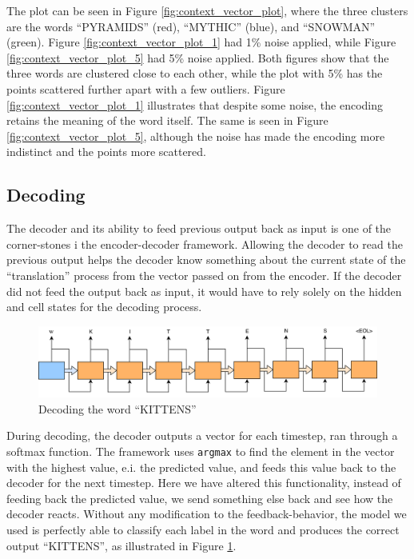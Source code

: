 The plot can be seen in Figure \ref{fig:context_vector_plot}, where the three clusters are the words ``PYRAMIDS'' (red), ``MYTHIC'' (blue), and ``SNOWMAN'' (green). Figure \ref{fig:context_vector_plot_1} had 1\% noise applied, while Figure \ref{fig:context_vector_plot_5} had 5\% noise applied. Both figures show that the three words are clustered close to each other, while the plot with 5\% has the points scattered further apart with a few outliers. Figure \ref{fig:context_vector_plot_1} illustrates that despite some noise, the encoding retains the meaning of the word itself. The same is seen in Figure \ref{fig:context_vector_plot_5}, although the noise has made the encoding more indistinct and the points more scattered.

\subsection{Decoding}
The decoder and its ability to feed previous output back as input is one of the corner-stones i the encoder-decoder framework. Allowing the decoder to read the previous output helps the decoder know something about the current state of the ``translation'' process from the vector passed on from the encoder. If the decoder did not feed the output back as input, it would have to rely solely on the hidden and cell states for the decoding process.

\begin{figure}[!ht]
    \centering
    \includegraphics[width=1\textwidth]{fig/results/kittens_correct.png}
    \caption{Decoding the word ``KITTENS''}
    \label{fig:kittens_correct}
\end{figure}

During decoding, the decoder outputs a vector for each timestep, ran through a softmax function. The framework uses {\tt argmax} to find the element in the vector with the highest value, e.i. the predicted value, and feeds this value back to the decoder for the next timestep. Here we have altered this functionality, instead of feeding back the predicted value, we send something else back and see how the decoder reacts. Without any modification to the feedback-behavior, the model we used is perfectly able to classify each label in the word and produces the correct output ``KITTENS'', as illustrated in Figure \ref{fig:kittens_correct}. 

